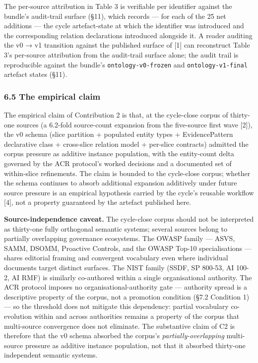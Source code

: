 \documentclass[
]{article}
\begin{document}
The per-source attribution in Table 3 is verifiable per identifier
against the bundle's audit-trail surface (§11), which records --- for
each of the 25 net additions --- the cycle artefact-state at which the
identifier was introduced and the corresponding relation declarations
introduced alongside it. A reader auditing the v0 → v1 transition
against the published surface of {[}1{]} can reconstruct Table 3's
per-source attribution from the audit-trail surface alone; the audit
trail is reproducible against the bundle's \texttt{ontology-v0-frozen}
and \texttt{ontology-v1-final} artefact states (§11).

\subsubsection{6.5 The empirical claim}\label{the-empirical-claim}

The empirical claim of Contribution 2 is that, at the cycle-close corpus
of thirty-one sources (a 6.2-fold source-count expansion from the
five-source first wave {[}2{]}), the v0 schema (slice partition +
populated entity types + EvidencePattern declarative class + cross-slice
relation model + per-slice contracts) admitted the corpus pressure as
additive instance population, with the entity-count delta governed by
the ACR protocol's worked decisions and a documented set of within-slice
refinements. The claim is bounded to the cycle-close corpus; whether the
schema continues to absorb additional expansion additively under future
source pressure is an empirical hypothesis carried by the cycle's
reusable workflow {[}4{]}, not a property guaranteed by the artefact
published here.

\textbf{Source-independence caveat.} The cycle-close corpus should not
be interpreted as thirty-one fully orthogonal semantic systems; several
sources belong to partially overlapping governance ecosystems. The OWASP
family --- ASVS, SAMM, DSOMM, Proactive Controls, and the OWASP Top-10
specialisations --- shares editorial framing and convergent vocabulary
even where individual documents target distinct surfaces. The NIST
family (SSDF, SP 800-53, AI 100-2, AI RMF) is similarly co-authored
within a single organisational authority. The ACR protocol imposes no
organisational-authority gate --- authority spread is a descriptive
property of the corpus, not a promotion condition (§7.2 Condition 1) ---
so the threshold does not mitigate this dependency: partial vocabulary
co-evolution within and across authorities remains a property of the
corpus that multi-source convergence does not eliminate. The substantive
claim of C2 is therefore that the v0 schema absorbed the corpus's
\emph{partially-overlapping} multi-source pressure as additive instance
population, not that it absorbed thirty-one independent semantic
systems.
\end{document}
